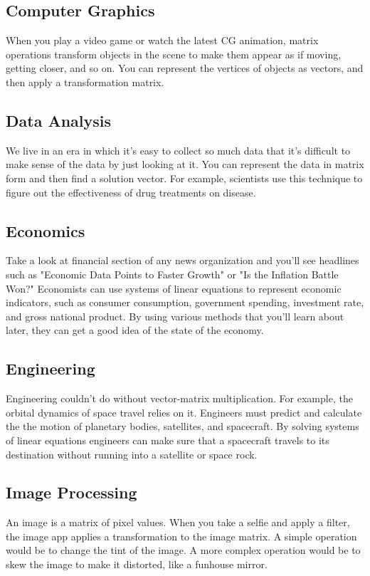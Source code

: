 \subsection{Computer Graphics}
When you play a video game or watch the latest CG animation, matrix operations transform objects in the scene to make them appear as if moving, getting closer, and so on. You can represent the vertices of objects as vectors, and then apply a transformation matrix.
\subsection{Data Analysis}
We live in an era in which it's easy to collect so much data that it's difficult to make sense of the data by just looking at it. You can represent the data in matrix form and then find a solution vector. For example, scientists use this technique to figure out the effectiveness of drug treatments on disease.
\subsection{Economics}
Take a look at financial section of any news organization and you'll see headlines such as "Economic Data Points to Faster Growth" or "Is the Inflation Battle Won?" Economists can use systems of linear equations to represent economic indicators, such as consumer consumption, government spending, investment rate, and gross national product. By using various methods that you'll learn about later, they can get a good idea of the state of the economy.
\subsection{Engineering}
Engineering couldn't do without vector-matrix multiplication. For example, the orbital dynamics of space travel relies on it. Engineers must predict and calculate the the motion of planetary bodies, satellites, and spacecraft. By solving systems of linear equations engineers can make sure that a spacecraft travels to its destination without running into a satellite or space rock.
\subsection{Image Processing}
An image is a matrix of pixel values. When you take a selfie and apply a filter, the image app applies a transformation to the image matrix. A simple operation would be to change the tint of the image. A more complex operation would be to skew the image to make it distorted, like a funhouse mirror.

